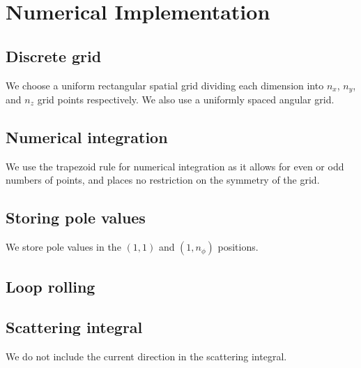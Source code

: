 \documentclass[10pt]{article}
\begin{document}
\section{Numerical Implementation}
\subsection{Discrete grid}
We choose a uniform rectangular spatial grid dividing each dimension into $n_x$,
$n_y$, and $n_z$ grid points respectively.
We also use a uniformly spaced angular grid.

\subsection{Numerical integration}
We use the trapezoid rule for numerical integration as it allows for even or odd
numbers of points, and places no restriction on the symmetry of the grid.
\subsection{Storing pole values}
We store pole values in the $(1,1)$ and $(1,n_\phi)$ positions.
\subsection{Loop rolling}
\subsection{Scattering integral}
We do not include the current direction in the scattering integral.
  
\end{document}
